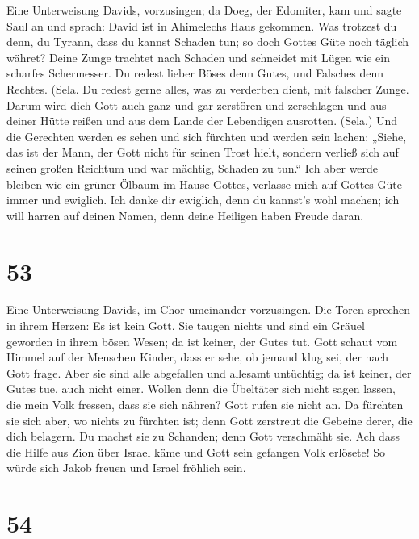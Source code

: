  Eine Unterweisung Davids, vorzusingen;  da
Doeg, der Edomiter, kam und sagte Saul an und sprach: David ist in
Ahimelechs Haus gekommen.  Was trotzest du denn, du
Tyrann, dass du kannst Schaden tun; so doch Gottes Güte noch täglich
währet?  Deine Zunge trachtet nach Schaden und schneidet
mit Lügen wie ein scharfes Schermesser.  Du redest lieber
Böses denn Gutes, und Falsches denn Rechtes. (Sela.  Du
redest gerne alles, was zu verderben dient, mit falscher Zunge.
 Darum wird dich Gott auch ganz und gar zerstören und
zerschlagen und aus deiner Hütte reißen und aus dem Lande der Lebendigen
ausrotten. (Sela.)  Und die Gerechten werden es sehen und
sich fürchten und werden sein lachen:  „Siehe, das ist der
Mann, der Gott nicht für seinen Trost hielt, sondern verließ sich auf
seinen großen Reichtum und war mächtig, Schaden zu tun.``
 Ich aber werde bleiben wie ein grüner Ölbaum im Hause
Gottes, verlasse mich auf Gottes Güte immer und ewiglich.
 Ich danke dir ewiglich, denn du kannst's wohl machen;
ich will harren auf deinen Namen, denn deine Heiligen haben Freude
daran.

\hypertarget{section-52}{%
\section{53}\label{section-52}}

 Eine Unterweisung Davids, im Chor umeinander vorzusingen.
 Die Toren sprechen in ihrem Herzen: Es ist kein Gott. Sie
taugen nichts und sind ein Gräuel geworden in ihrem bösen Wesen; da ist
keiner, der Gutes tut.  Gott schaut vom Himmel auf der
Menschen Kinder, dass er sehe, ob jemand klug sei, der nach Gott frage.
 Aber sie sind alle abgefallen und allesamt untüchtig; da
ist keiner, der Gutes tue, auch nicht einer.  Wollen denn
die Übeltäter sich nicht sagen lassen, die mein Volk fressen, dass sie
sich nähren? Gott rufen sie nicht an.  Da fürchten sie
sich aber, wo nichts zu fürchten ist; denn Gott zerstreut die Gebeine
derer, die dich belagern. Du machst sie zu Schanden; denn Gott
verschmäht sie.  Ach dass die Hilfe aus Zion über Israel
käme und Gott sein gefangen Volk erlösete! So würde sich Jakob freuen
und Israel fröhlich sein.

\hypertarget{section-53}{%
\section{54}\label{section-53}}

